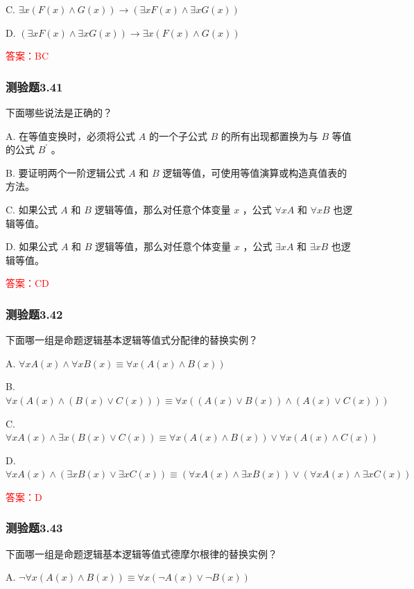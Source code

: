 \documentclass[UTF8, heading=true]{ctexart}
\begin{document}
C. $
\exists x(F(x) \wedge G(x)) \rightarrow(\exists x F(x) \wedge \exists x G(x))
$

D. $
(\exists x F(x) \wedge \exists x G(x)) \rightarrow \exists x(F(x) \wedge G(x))
$

\textcolor{red}{答案：BC}

\subsubsection{测验题3.41}

下面哪些说法是正确的？

A.
在等值变换时，必须将公式 $A$ 的一个子公式 $B$ 的所有出现都置换为与 $B$ 等值的公式 $B^{\prime}$ 。

B.
要证明两个一阶逻辑公式 $A$ 和 $B$ 逻辑等值，可使用等值演算或构造真值表的方法。

C.
如果公式 $A$ 和 $B$ 逻辑等值，那么对任意个体变量 $x$ ，公式 $\forall x A$ 和 $\forall x B$ 也逻辑等值。

D.
如果公式 $A$ 和 $B$ 逻辑等值，那么对任意个体变量 $x$ ，公式 $\exists x A$ 和 $\exists x B$ 也逻辑等值。


\textcolor{red}{答案：CD}

\subsubsection{测验题3.42}

下面哪一组是命题逻辑基本逻辑等值式分配律的替换实例？

A. $\forall x A(x) \wedge \forall x B(x) \equiv \forall x(A(x) \wedge B(x))$

B. $\forall x(A(x) \wedge(B(x) \vee C(x))) \equiv \forall x((A(x) \vee B(x)) \wedge(A(x) \vee C(x)))$

C. $\forall x A(x) \wedge \exists x(B(x) \vee C(x)) \equiv \forall x(A(x) \wedge B(x)) \vee \forall x(A(x) \wedge C(x))$

D. $\forall x A(x) \wedge(\exists x B(x) \vee \exists x C(x)) \equiv(\forall x A(x) \wedge \exists x B(x)) \vee(\forall x A(x) \wedge \exists x C(x))$

\textcolor{red}{答案：D}

\subsubsection{测验题3.43}

下面哪一组是命题逻辑基本逻辑等值式德摩尔根律的替换实例？

A. $ \neg \forall x(A(x) \wedge B(x)) \equiv \forall x(\neg A(x) \vee \neg B(x))$
\end{document}
